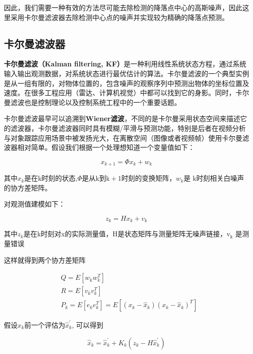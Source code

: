 因此，我们需要一种有效的方法尽可能去除检测的降落点中心的高斯噪声，因此这里采用卡尔曼滤波器去除检测中心点的噪声并实现较为精确的降落点预测。

\subsection{卡尔曼滤波器}

\textbf{卡尔曼滤波（Kalman filtering, KF）}是一种利用线性系统状态方程，通过系统输入输出观测数据，对系统状态进行最优估计的算法\cite{ArtE3}。卡尔曼滤波的一个典型实例是从一组有限的，对物体位置的，包含噪声的观察序列中预测出物体的坐标位置及速度。在很多工程应用（雷达、计算机视觉）中都可以找到它的身影。同时，卡尔曼滤波也是控制理论以及控制系统工程中的一个重要话题。

卡尔曼滤波最早可以追溯到\textbf{Wiener滤波}，不同的是卡尔曼采用状态空间来描述它的滤波器，卡尔曼滤波器同时具有模糊/平滑与预测功能，特别是后者在视频分析与对象跟踪应用场景中被发扬光大，在离散空间（图像或者视频帧）使用卡尔曼滤波器相对简单。假设我们根据一个处理想知道一个变量值如下：

\begin{equation}
x_{k+1}=\Phi x_{k}+w_{k}
\end{equation}

其中$x_{k}$是在$\mathrm{k}$时刻的状态,$\Phi$是从$\mathrm{k}$到$\mathrm{k}+1$时刻的变换矩阵，$w_{k}$是 $\mathrm{k}$时刻相关白噪声的协方差矩阵。

对观测值建模如下：

\begin{equation}
z_{k}=H x_{k}+v_{k}
\end{equation}

其中$z_{k}$是在k时刻对x的实际测量值，$\mathrm{H}$是状态矩阵与测量矩阵无噪声链接，$\mathrm{v}_{\mathrm{k}}$ 是测量错误

这样就得到两个协方差矩阵

\begin{equation}
\begin{aligned}
&Q=E\left[w_{k} w_{k}^{T}\right] \\
&R=E\left[v_{k} v_{k}^{T}\right] \\
&P_{k}=E\left[e_{k} e_{k}^{T}\right]=E\left[\left(x_{k}-\hat{x}_{k}\right)\left(x_{k}-\hat{x}_{k}\right)^{T}\right]
\end{aligned}
\end{equation}

假设$\hat{x}_{k}$前一个评估为$\hat{x}_{k}^{\prime}$, 可以得到

\begin{equation}
\hat{x}_{k}=\hat{x}_{k}^{\prime}+K_{k}\left(z_{k}-H \hat{x}_{k}^{\prime}\right)
\end{equation}

